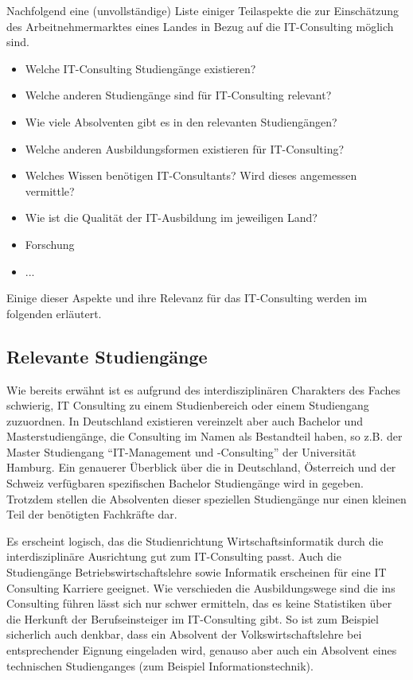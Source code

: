 Nachfolgend eine (unvollständige) Liste einiger Teilaspekte die zur Einschätzung des Arbeitnehmermarktes eines Landes in Bezug auf die IT-Consulting möglich sind. 
\begin{itemize} 
\item Welche IT-Consulting Studiengänge existieren?
\item Welche anderen Studiengänge sind für IT-Consulting relevant?
\item Wie viele Absolventen gibt es in den relevanten Studiengängen?
\item Welche anderen Ausbildungsformen existieren für IT-Consulting?
\item Welches Wissen benötigen IT-Consultants? Wird dieses angemessen vermittle?
\item Wie ist die Qualität der IT-Ausbildung im jeweiligen Land?
\item Forschung
\item ...
\end{itemize}

Einige dieser Aspekte und ihre Relevanz für das IT-Consulting werden im folgenden erläutert.

\subsection*{Relevante Studiengänge}
Wie bereits erwähnt ist es aufgrund des interdisziplinären Charakters des Faches schwierig, IT Consulting zu einem Studienbereich oder einem Studiengang zuzuordnen. 
In Deutschland existieren vereinzelt aber auch Bachelor und Masterstudiengänge, die Consulting im Namen als Bestandteil haben, so z.B. der Master Studiengang ``IT-Management und -Consulting'' der Universität Hamburg. Ein genauerer Überblick über die in Deutschland, Österreich und der Schweiz verfügbaren spezifischen Bachelor Studiengänge wird in \cite{NissenKlaukDeelmannMohe201209} gegeben. Trotzdem stellen die Absolventen dieser speziellen Studiengänge nur einen kleinen Teil der benötigten Fachkräfte dar.

Es erscheint logisch, das die Studienrichtung Wirtschaftsinformatik durch die interdisziplinäre Ausrichtung gut zum IT-Consulting passt. Auch die Studiengänge Betriebswirtschaftslehre sowie Informatik erscheinen für eine IT Consulting Karriere geeignet. Wie verschieden die Ausbildungswege sind die ins Consulting führen lässt sich nur schwer ermitteln, das es keine Statistiken über die Herkunft der Berufseinsteiger im IT-Consulting gibt.
So ist zum Beispiel sicherlich auch denkbar, dass ein Absolvent der Volkswirtschaftslehre bei entsprechender Eignung eingeladen wird, genauso aber auch ein Absolvent eines technischen Studienganges (zum Beispiel Informationstechnik).

